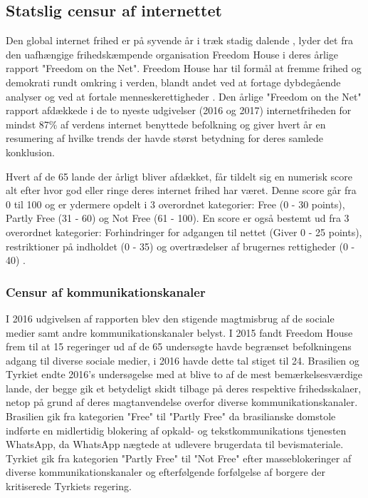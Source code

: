 \newpage
\subsection{Statslig censur af internettet}
Den global internet frihed er på syvende år i træk stadig dalende \cite{FreedomHouseRapport2017}, lyder det fra den uafhængige frihedskæmpende organisation Freedom House i deres årlige rapport "Freedom on the Net". Freedom House har til formål at fremme frihed og demokrati rundt omkring i verden, blandt andet ved at fortage dybdegående analyser og ved at fortale menneskerettigheder \cite{FreedomHouseAbout}. Den årlige "Freedom on the Net" rapport afdækkede i de to nyeste udgivelser (2016 og 2017) internetfriheden for mindst 87\% af verdens internet benyttede befolkning og giver hvert år en resumering af hvilke trends der havde størst betydning for deres samlede konklusion. 

Hvert af de 65 lande der årligt bliver afdækket, får tildelt sig en numerisk score alt efter hvor god eller ringe deres internet frihed har været. Denne score går fra 0 til 100 og er ydermere opdelt i 3 overordnet kategorier: Free (0 - 30 points), Partly Free (31 - 60) og Not Free (61 - 100). En score er også bestemt ud fra 3 overordnet kategorier: Forhindringer for adgangen til nettet (Giver 0 - 25 points), restriktioner på indholdet (0 - 35) og overtrædelser af brugernes rettigheder (0 - 40) \cite{FreedomHouseRapportMethodology}.

\subsubsection{Censur af kommunikationskanaler}
I 2016 udgivelsen af rapporten blev den stigende magtmisbrug af de sociale medier samt andre kommunikationskanaler belyst. I 2015 fandt Freedom House frem til at 15 regeringer ud af de 65 undersøgte havde begrænset befolkningens adgang til diverse sociale medier, i 2016 havde dette tal stiget til 24. Brasilien og Tyrkiet endte 2016's undersøgelse med at blive to af de mest bemærkelsesværdige lande, der begge gik et betydeligt skidt tilbage på deres respektive frihedsskalaer, netop på grund af deres magtanvendelse overfor diverse kommunikationskanaler. Brasilien gik fra kategorien "Free" til "Partly Free" da brasilianske domstole indførte en midlertidig blokering af opkald- og tekstkommunikations tjenesten WhatsApp, da WhatsApp nægtede at udlevere brugerdata til bevismateriale. Tyrkiet gik fra kategorien "Partly Free" til "Not Free" efter masseblokeringer af diverse kommunikationskanaler og efterfølgende forfølgelse af borgere der kritiserede Tyrkiets regering. 

